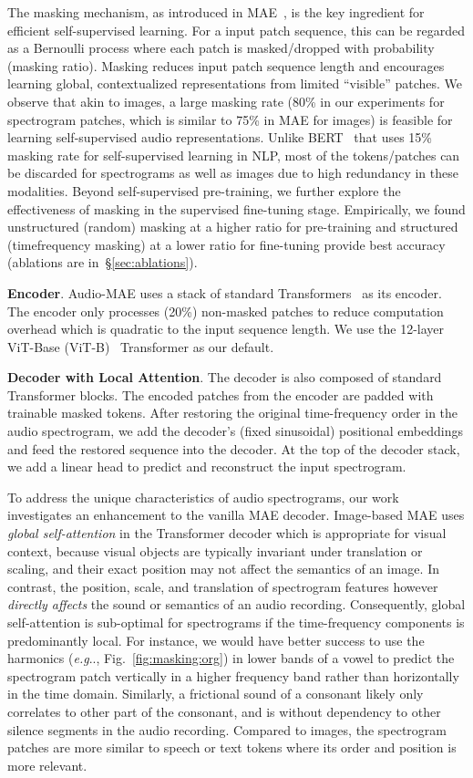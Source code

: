 \documentclass{article}
\makeatletter
\DeclareRobustCommand\onedot{\futurelet\@let@token\@onedot}
\def\@onedot{\ifx\@let@token.\else.\null\fi\xspace}
\def\eg{\emph{e.g}\onedot} \def\Eg{\emph{E.g}\onedot}
\makeatother
\begin{document}
The masking mechanism, as introduced in MAE~\cite{mae}, is the key ingredient for efficient self-supervised learning.
For a input patch sequence, this can be regarded as a Bernoulli process where each patch is masked/dropped with probability  (masking ratio).
Masking reduces input patch sequence length and encourages learning global, contextualized representations from limited ``visible'' patches.
We observe that akin to images, a large masking rate (80\% in our experiments for spectrogram patches, which is similar to 75\% in MAE for images) is feasible for learning self-supervised audio representations. 
Unlike BERT~\cite{bert} that uses 15\% masking rate for self-supervised learning in NLP, most of the tokens/patches can be discarded for spectrograms as well as images due to high redundancy in these modalities.
Beyond self-supervised pre-training, we further explore the effectiveness of masking in the supervised fine-tuning stage. 
Empirically, we found unstructured (random) masking at a higher ratio for pre-training and structured (timefrequency masking) at a lower ratio for fine-tuning provide best accuracy (ablations are in~\S\ref{sec:ablations}).

\noindent \textbf{Encoder}.
Audio-MAE uses a stack of standard Transformers~\cite{Vaswani:2017:AYN:3295222.3295349} as its encoder. 
The encoder only processes (20\%) non-masked patches to reduce computation overhead which is quadratic to the input sequence length.
We use the 12-layer ViT-Base (ViT-B)~\cite{dosovitskiy2020image} Transformer as our default.

\noindent \textbf{Decoder with Local Attention}.
The decoder is also composed of standard Transformer blocks.
The encoded patches from the encoder are padded with trainable masked tokens.
After restoring the original time-frequency order in the audio spectrogram, we add the decoder's (fixed sinusoidal) positional embeddings and feed the restored sequence into the decoder. 
At the top of the decoder stack, we add a linear head to predict and reconstruct the input spectrogram.

To address the unique characteristics of audio spectrograms, our work investigates an enhancement to the vanilla MAE decoder.
Image-based MAE uses \emph{global self-attention} in the Transformer decoder which is appropriate for visual context, because visual objects are typically invariant under translation or scaling, and their exact position may not affect the semantics of an image.
In contrast, the position, scale, and translation of spectrogram features however \textit{directly affects} the sound or semantics of an audio recording.
Consequently, global self-attention is sub-optimal for spectrograms if the time-frequency components is predominantly local.
For instance, 
we would have better success to use the harmonics (\eg, Fig.~\ref{fig:masking:org}) in lower bands of a vowel to predict the spectrogram patch vertically in a higher frequency band rather than horizontally in the time domain.
Similarly, a frictional sound of a consonant likely only correlates to other part of the consonant, and is without dependency to other silence segments in the audio recording.
Compared to images, the spectrogram patches are more similar to speech or text tokens where its order and position is more relevant.
\end{document}
